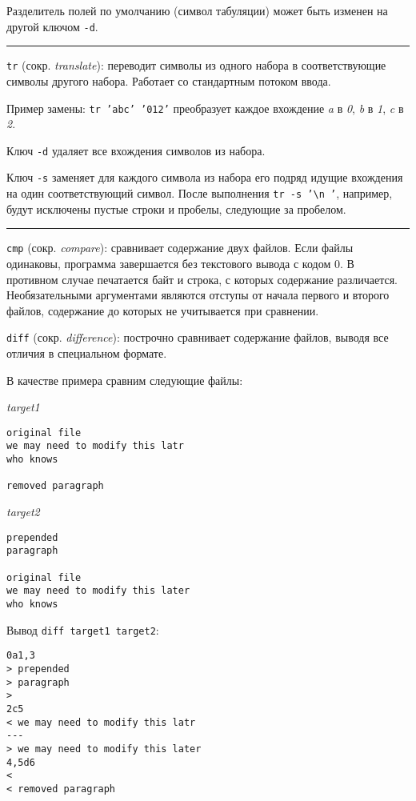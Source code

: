 \documentclass[listings]{labreport}
\begin{document}
Разделитель полей по умолчанию (символ табуляции) может быть изменен на другой
ключом \texttt{-d}.

\noindent\rule{\textwidth}{1pt}

\texttt{tr} (сокр. \textit{translate}): переводит символы из одного набора
в соответствующие символы другого набора. Работает со стандартным потоком ввода.

Пример замены: \texttt{tr 'abc' '012'} преобразует каждое вхождение
\textit{a} в \textit{0}, \textit{b} в \textit{1}, \textit{c} в \textit{2}.

Ключ \texttt{-d} удаляет все вхождения символов из набора.

Ключ \texttt{-s} заменяет для каждого символа из набора его
подряд идущие вхождения на один соответствующий символ. После выполнения
\texttt{tr -s '{\textbackslash}n '}, например, будут исключены пустые строки и пробелы, следующие за пробелом.

\noindent\rule{\textwidth}{1pt}

\texttt{cmp} (сокр. \textit{compare}): сравнивает содержание двух файлов. Если файлы одинаковы,
программа завершается без текстового вывода с кодом 0. В противном случае печатается байт и строка,
с которых содержание различается. Необязательными аргументами являются отступы от начала первого и второго файлов,
содержание до которых не учитывается при сравнении.

\texttt{diff} (сокр. \textit{difference}): построчно сравнивает содержание файлов, выводя все отличия в специальном формате.

В качестве примера сравним следующие файлы:

\begin{multicols}{2}
\noindent\textit{target1}
\begin{verbatim}
original file
we may need to modify this latr
who knows

removed paragraph

\end{verbatim}

\noindent\textit{target2}
\begin{verbatim}
prepended
paragraph

original file
we may need to modify this later
who knows
\end{verbatim}
\end{multicols}

Вывод \texttt{diff target1 target2}:

\begin{verbatim}
0a1,3
> prepended
> paragraph
> 
2c5
< we may need to modify this latr
---
> we may need to modify this later
4,5d6
< 
< removed paragraph
\end{verbatim}
\end{document}
